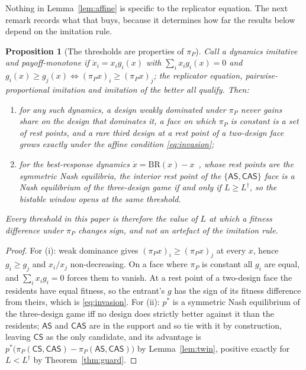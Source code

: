 \documentclass[pdflatex]{sn-jnl}
\theoremstyle{thmstyleone}
\newtheorem{proposition}[theorem]{Proposition}
\theoremstyle{thmstylethree}
\theoremstyle{thmstyletwo}
\newcommand{\AS}{\textsf{AS}}
\newcommand{\CS}{\textsf{CS}}
\newcommand{\CAS}{\textsf{CAS}}
\newcommand{\piP}{\pi_{P}}
\begin{document}
Nothing in Lemma~\ref{lem:affine} is specific to the replicator equation. The
next remark records what that buys, because it determines how far the results
below depend on the imitation rule.

\begin{proposition}[The thresholds are properties of $\piP$]\label{prop:dynfree}
Call a dynamics \emph{imitative and payoff-monotone} if
$\dot{x}_i=x_i g_i(x)$ with $\sum_i x_i g_i(x)=0$ and
$g_i(x)\ge g_j(x)\iff(\piP x)_i\ge(\piP x)_j$; the replicator equation,
pairwise-proportional imitation and imitation of the better all qualify. Then:
\begin{enumerate}
\item[(i)] for any such dynamics, a design weakly dominated under $\piP$ never
gains share on the design that dominates it, a face on which $\piP$ is
constant is a set of rest points, and a rare third design at a rest point of a
two-design face grows exactly under the affine condition \eqref{eq:invasion};
\item[(ii)] for the best-response dynamics $\dot{x}=\mathrm{BR}(x)-x$~\citep{gilboa1991social,matsui1992best}, whose
rest points are the symmetric Nash equilibria, the interior rest point of the
$\{\AS,\CAS\}$ face is a Nash equilibrium of the three-design game if and only
if $L\ge L^{\dagger}$, so the bistable window opens at the same threshold.
\end{enumerate}
Every threshold in this paper is therefore the value of $L$ at which a fitness
difference under $\piP$ changes sign, and not an artefact of the imitation
rule.
\end{proposition}

\begin{proof}
For (i): weak dominance gives $(\piP x)_i\ge(\piP x)_j$ at every $x$, hence
$g_i\ge g_j$ and $x_i/x_j$ non-decreasing. On a face where $\piP$ is constant
all $g_i$ are equal, and $\sum_i x_ig_i=0$ forces them to vanish. At a rest
point of a two-design face the residents have equal fitness, so the entrant's
$g$ has the sign of its fitness difference from theirs, which is
\eqref{eq:invasion}. For (ii): $p^{*}$ is a symmetric Nash equilibrium of the
three-design game iff no design does strictly better against it than the
residents; $\AS$ and $\CAS$ are in the support and so tie with it by
construction, leaving $\CS$ as the only candidate, and its advantage is
$p^{*}\big(\piP(\CS,\CAS)-\piP(\AS,\CAS)\big)$ by Lemma~\ref{lem:twin},
positive exactly for $L<L^{\dagger}$ by Theorem~\ref{thm:guard}.
\end{proof}
\end{document}
